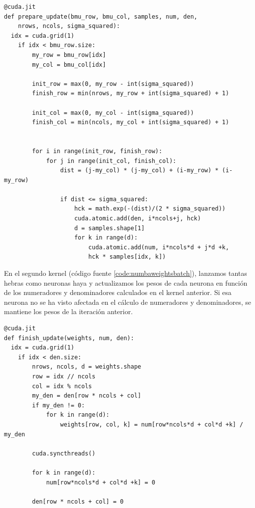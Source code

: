 \begin{code}
\begin{verbatim}
@cuda.jit
def prepare_update(bmu_row, bmu_col, samples, num, den, 
    nrows, ncols, sigma_squared):
  idx = cuda.grid(1)
    if idx < bmu_row.size:
        my_row = bmu_row[idx]
        my_col = bmu_col[idx]
        
        init_row = max(0, my_row - int(sigma_squared))
        finish_row = min(nrows, my_row + int(sigma_squared) + 1)
        
        init_col = max(0, my_col - int(sigma_squared))
        finish_col = min(ncols, my_col + int(sigma_squared) + 1)
        
    
        for i in range(init_row, finish_row):
            for j in range(init_col, finish_col):
                dist = (j-my_col) * (j-my_col) + (i-my_row) * (i-my_row)
    
                if dist <= sigma_squared:
                    hck = math.exp(-(dist)/(2 * sigma_squared))
                    cuda.atomic.add(den, i*ncols+j, hck)
                    d = samples.shape[1]
                    for k in range(d):
                        cuda.atomic.add(num, i*ncols*d + j*d +k,
                        hck * samples[idx, k])
\end{verbatim}
\label{code:numbanumdem}
\end{code}

En el segundo kernel (código fuente \ref{code:numbaweightsbatch}), lanzamos tantas hebras como neuronas haya y actualizamos los pesos de cada neurona en función de los numeradores y denominadores calculados en el kernel anterior. Si esa neurona no se ha visto afectada en el cálculo de numeradores y denominadores, se mantiene los pesos de la iteración anterior.
\begin{code}
\begin{verbatim}
@cuda.jit
def finish_update(weights, num, den):
  idx = cuda.grid(1)
    if idx < den.size:
        nrows, ncols, d = weights.shape
        row = idx // ncols
        col = idx % ncols
        my_den = den[row * ncols + col]
        if my_den != 0:
            for k in range(d):
                weights[row, col, k] = num[row*ncols*d + col*d +k] / my_den
      
        cuda.syncthreads()
       
        for k in range(d):
            num[row*ncols*d + col*d +k] = 0
            
        den[row * ncols + col] = 0
\end{verbatim}
\label{code:numbaweightsbatch}
\end{code}



